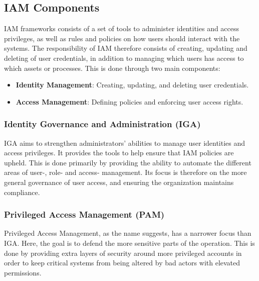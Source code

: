 \subsection{IAM Components}
IAM frameworks consists of a set of tools to administer identities and access privileges, as well as rules and policies on how users should interact with the systems. The responsibility of IAM therefore consists of creating, updating and deleting of user credentials, in addition to managing which users has access to which assets or processes\citep{IAM-ComprehensiveStudy}. This is done through two main components:
\begin{itemize}
	\item \textbf{Identity Management}: Creating, updating, and deleting user credentials.
	\item \textbf{Access Management}: Defining policies and enforcing user access rights.
\end{itemize}

\subsubsection{Identity Governance and Administration (IGA)}
IGA aims to strengthen administrators' abilities to manage user identities and access privileges. It provides the tools to help ensure that IAM policies are upheld\citep{StrongDM-IGAvsPAM,CoreSec-DiffIAMIGAPAM}. This is done primarily by providing the ability to automate the different areas of user-, role- and access- management. Its focus is therefore on the more general governance of user access, and ensuring the organization maintains compliance.

\subsubsection{Privileged Access Management (PAM)}
Privileged Access Management, as the name suggests, has a narrower focus than IGA. Here, the goal is to defend the more sensitive parts of the operation\citep{StrongDM-IGAvsPAM,CoreSec-DiffIAMIGAPAM}. This is done by providing extra layers of security around more privileged accounts in order to keep critical systems from being altered by bad actors with elevated permissions.

